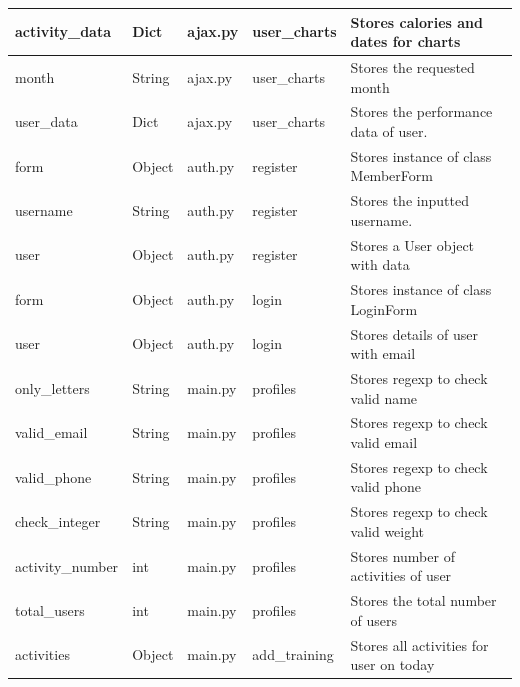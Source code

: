 \documentclass{article}[12pt,a4paper]
\begin{document}
\begin{table}[h]
\begin{tabular}{lllll}
activity\_data    & Dict          & ajax.py             & user\_charts            & Stores calories and dates for charts    \\ \hline
month             & String        & ajax.py             & user\_charts            & Stores the requested month              \\ \hline
user\_data        & Dict          & ajax.py             & user\_charts            & Stores the performance data of user.    \\ \hline
form              & Object        & auth.py             & register                & Stores instance of class MemberForm     \\ \hline
username          & String        & auth.py             & register                & Stores the inputted username.           \\ \hline
user              & Object        & auth.py             & register                & Stores a User object with data          \\ \hline
form              & Object        & auth.py             & login                   & Stores instance of class LoginForm      \\ \hline
user              & Object        & auth.py             & login                   & Stores details of user with email       \\ \hline
only\_letters     & String        & main.py             & profiles                & Stores regexp to check valid name       \\ \hline
valid\_email      & String        & main.py             & profiles                & Stores regexp to check valid email      \\ \hline
valid\_phone      & String        & main.py             & profiles                & Stores regexp to check valid phone      \\ \hline
check\_integer    & String        & main.py             & profiles                & Stores regexp to check valid weight     \\ \hline
activity\_number  & int           & main.py             & profiles                & Stores number of activities of user     \\ \hline
total\_users      & int           & main.py             & profiles                & Stores the total number of users        \\ \hline
activities        & Object        & main.py             & add\_training           & Stores all activities for user on today \\ \hline

\end{tabular}
\end{table}
\end{document}
